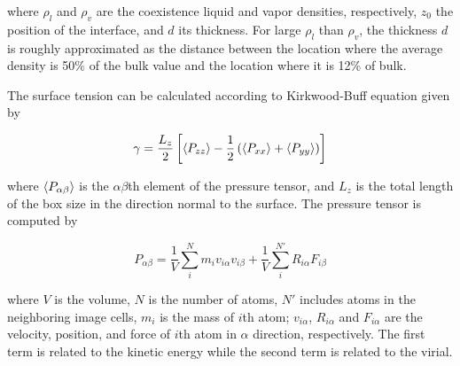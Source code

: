 \begin{itemize}
          where  $\rho_l$ and $\rho_v$ are the  coexistence liquid and vapor densities, respectively,  $z_0$ the position of the interface, and $d$ its thickness. For large $\rho_l$ than  $\rho_v$,  the thickness $d$ is roughly approximated as the distance between the location where the average density is 50\% of the bulk value and the location where it is 12\% of bulk.


          The surface tension can be
          calculated according to Kirkwood-Buff
          equation
          \cite{kirkwood1949} given by

          \begin{equation}
              \gamma = \frac{L_z}{2} \left[ \expval{P_{zz}} -\frac{1}{2} \left(
                  \expval{P_{xx}} + \expval{P_{yy}} \right) \right]
              \label{eq:surf_tens}
          \end{equation}

          where $\expval{P_{\alpha \beta}}$ is the $\alpha \beta$th element of the pressure tensor,
          and $L_z$ is the total length of the box size in the direction normal
          to the
          surface. The pressure tensor is computed by \cite{thompson2009general}

          \begin{equation}
              P_{\alpha \beta} = \frac{1}{V}  \sum_i^N m_i v_{i\alpha} v_{i\beta} + \frac{1}{V}  \sum_i^{N'} R_{i\alpha} F_{i\beta}
          \end{equation}

          where $V$ is the volume, $N$ is the number of atoms, $N'$ includes atoms in the neighboring image cells, $m_i$ is the mass of $i$th atom; $v_{i\alpha}$, $R_{i\alpha}$ and $F_{i\alpha}$  are the velocity, position, and force of $i$th atom in $\alpha$ direction, respectively. The first term is related to the kinetic energy while the second term is related to the virial.


\end{itemize}
